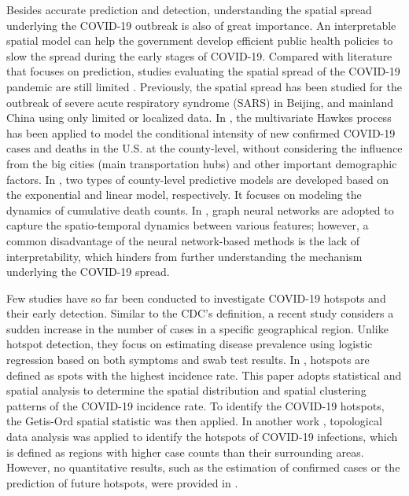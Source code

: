 \documentclass[journal]{IEEEtran}
\begin{document}
Besides accurate prediction and detection, understanding the spatial spread underlying the COVID-19 outbreak is also of great importance. An interpretable spatial model can help the government develop efficient public health policies to slow the spread during the early stages of COVID-19.
Compared with literature that focuses on prediction, studies evaluating the spatial spread of the COVID-19 pandemic are still limited \cite{poirier2020real}. 
Previously, the spatial spread has been studied for the outbreak of severe acute respiratory syndrome (SARS) in Beijing, and mainland China \cite{Meng2005, Fang2009, Kang2020, Jia2020, CCDCP2020,Meng2005} using only limited or localized data. In \cite{chiang2020hawkes}, the multivariate Hawkes process has been applied to model the conditional intensity of new confirmed COVID-19 cases and deaths in the U.S. at the county-level, without considering the influence from the big cities (main transportation hubs) and other important demographic factors. 
In \cite{altieri2020curating}, two types of county-level predictive models are developed based on the exponential and linear model, respectively. It focuses on modeling the dynamics of cumulative death counts.
In \cite{kapoor2020examining}, graph neural networks are adopted to capture the spatio-temporal dynamics between various features; however, a common disadvantage of the neural network-based methods is the lack of interpretability, which hinders from further understanding the mechanism underlying the COVID-19 spread.

Few studies have so far been conducted to investigate COVID-19 hotspots and their early detection. 
Similar to the CDC's definition, a recent study \cite{varsavsky2021detecting} considers a sudden increase in the number of cases in a specific geographical region. Unlike hotspot detection, they focus on estimating disease prevalence using logistic regression based on both symptoms and swab test results. 
In \cite{shariati2020spatiotemporal}, hotspots are defined as spots with the highest incidence rate. This paper adopts statistical and spatial analysis to determine the spatial distribution and spatial clustering patterns of the COVID-19 incidence rate. To identify the COVID-19 hotspots, the Getis-Ord spatial statistic \cite{getis2010analysis} was then applied. 
In another work \cite{feng2021topological}, topological data analysis was applied to identify the hotspots of COVID-19 infections, which is defined as regions with higher case counts than their surrounding areas. However, no quantitative results, such as the estimation of confirmed cases or the prediction of future hotspots, were provided in \cite{feng2021topological}.
\end{document}
